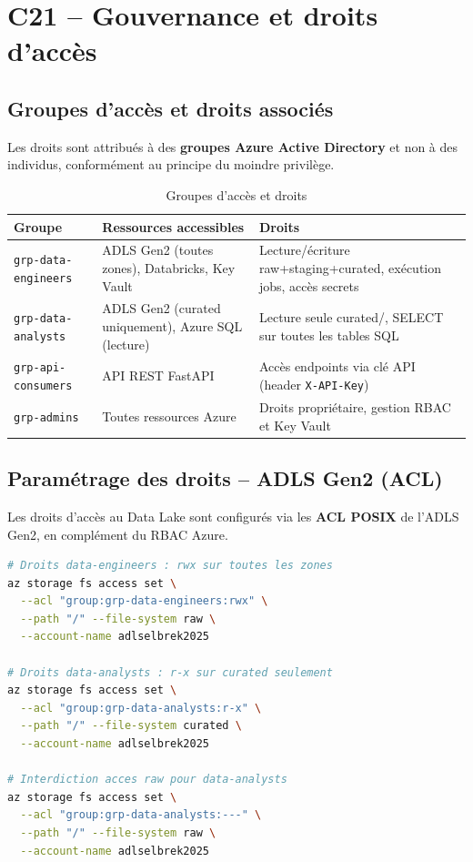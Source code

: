 \documentclass[12pt,a4paper]{article}
\begin{document}
\section{C21 -- Gouvernance et droits d'accès}

\subsection{Groupes d'accès et droits associés}

Les droits sont attribués à des \textbf{groupes Azure Active Directory} et non à des individus, conformément au principe du moindre privilège.

\begin{table}[H]
\centering
\small
\begin{tabular}{L{3.5cm} L{4cm} L{6cm}}
  \toprule
  \textbf{Groupe} & \textbf{Ressources accessibles} & \textbf{Droits} \\
  \midrule
  \texttt{grp-data-engineers} & ADLS Gen2 (toutes zones), Databricks, Key Vault & Lecture/écriture raw+staging+curated, exécution jobs, accès secrets \\
  \texttt{grp-data-analysts} & ADLS Gen2 (curated uniquement), Azure SQL (lecture) & Lecture seule curated/, SELECT sur toutes les tables SQL \\
  \texttt{grp-api-consumers} & API REST FastAPI & Accès endpoints via clé API (header \texttt{X-API-Key}) \\
  \texttt{grp-admins} & Toutes ressources Azure & Droits propriétaire, gestion RBAC et Key Vault \\
  \bottomrule
\end{tabular}
\caption{Groupes d'accès et droits}
\end{table}

\subsection{Paramétrage des droits -- ADLS Gen2 (ACL)}

Les droits d'accès au Data Lake sont configurés via les \textbf{ACL POSIX} de l'ADLS Gen2, en complément du RBAC Azure.

\begin{lstlisting}[language=bash, caption=Configuration ACL via Azure CLI]
# Droits data-engineers : rwx sur toutes les zones
az storage fs access set \
  --acl "group:grp-data-engineers:rwx" \
  --path "/" --file-system raw \
  --account-name adlselbrek2025

# Droits data-analysts : r-x sur curated seulement
az storage fs access set \
  --acl "group:grp-data-analysts:r-x" \
  --path "/" --file-system curated \
  --account-name adlselbrek2025

# Interdiction acces raw pour data-analysts
az storage fs access set \
  --acl "group:grp-data-analysts:---" \
  --path "/" --file-system raw \
  --account-name adlselbrek2025
\end{lstlisting}
\end{document}
